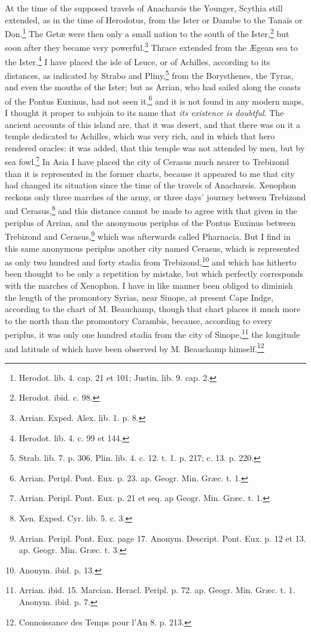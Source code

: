 \documentclass[a4paper, 11pt, oneside, polutonikogreek, english]{article}
\begin{document}
At the time of the supposed travels of Anacharsis the Younger, Scythia still extended, as in the time of Herodotus, from the Ister or Danube to the Tanaïs or Don.\footnote{Herodot. lib. 4. cap. 21 et 101; Justin. lib. 9. cap. 2.} The Getæ were then only a small nation to the south of the Ister,\footnote{Herodot. ibid. c. 98.} but soon after they became very powerful.\footnote{Arrian. Exped. Alex. lib. 1. p. 8.} Thrace extended from the Ægean sea to the Ister.\footnote{Herodot. lib. 4. c. 99 et 144.} I have placed the isle of Leuce, or of Achilles, according to its distances, as indicated by Strabo and Pliny,\footnote{Strab. lib. 7. p. 306. Plin. lib. 4. c. 12. t. 1. p. 217; c. 13. p. 220.} from the Borysthenes, the Tyras, and even the mouths of the Ister; but as Arrian, who had sailed along the coasts of the Pontus Euxinus, had not seen it,\footnote{Arrian. Peripl. Pont. Eux. p. 23. ap. Geogr. Min. Græc. t. 1.} and it is not found in any modern maps, I thought it proper to subjoin to its name that \emph{its existence is doubtful}. The ancient accounts of this island are, that it was desert, and that there was on it a temple dedicated to Achilles, which was very rich, and in which that hero rendered oracles: it was added, that this temple was not attended by men, but by sea fowl.\footnote{Arrian. Peripl. Pont. Eux. p. 21 et seq. ap Geogr. Min. Græc. t. 1.} In Asia I have placed the city of Cerasus much nearer to Trebizond than it is represented in the former charts, because it appeared to me that city had changed its situation since the time of the travels of Anacharsis. Xenophon reckons only three marches of the army, or three days' journey between Trebizond and Cerasus,\footnote{Xen. Exped. Cyr. lib. 5. c. 3.} and this distance cannot be made to agree with that given in the periplus of Arrian, and the anonymous periplus of the Pontus Euxinus between Trebizond and Cerasus,\footnote{Arrian. Peripl. Pont. Eux. page 17. Anonym. Descript. Pont. Eux. p. 12 et 13. ap. Geogr. Min. Græc. t. 3.} which was afterwards called Pharnacia. But I find in this same anonymous periplus another city named Cerasus, which is represented as only two hundred and forty stadia from Trebizond,\footnote{Anonym. ibid. p. 13.} and which has hitherto been thought to be only a repetition by mistake, but which perfectly corresponds with the marches of Xenophon. I have in like manner been obliged to diminish the length of the promontory Syrias, near Sinope, at present Cape Indge, according to the chart of M. Beauchamp, though that chart places it much more to the north than the promontory Carambis, because, according to every periplus, it was only one hundred stadia from the city of Sinope,\footnote{Arrian. ibid. 15. Marcian. Heracl. Peripl. p. 72. ap. Geogr. Min. Græc. t. 1. Anonym. ibid. p. 7.} the longitude and latitude of which have been observed by M. Beauchamp himself.\footnote{Connoissance des Temps pour l'An 8. p. 213.}
\end{document}
